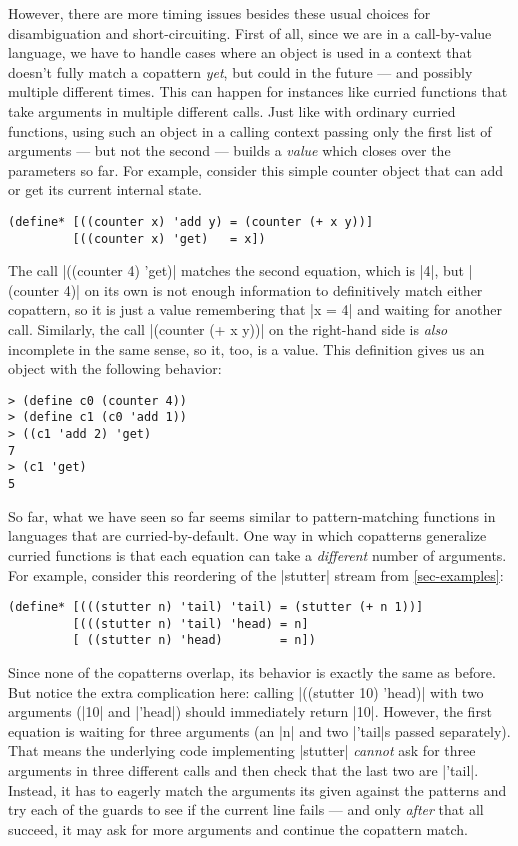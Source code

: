 However, there are more timing issues besides these usual choices for disambiguation and short-circuiting.
First of all, since we are in a call-by-value language, we have to handle cases where an object is used in a context that doesn't fully match a copattern \emph{yet}, but could in the future --- and possibly multiple different times.
This can happen for instances like curried functions that take arguments in multiple different calls.
Just like with ordinary curried functions, using such an object in a calling context passing only the first list of arguments --- but not the second --- builds a \emph{value} which closes over the parameters so far.
For example, consider this simple counter object that can add or get its current internal state.
\begin{verbatim}
(define* [((counter x) 'add y) = (counter (+ x y))]
         [((counter x) 'get)   = x])
\end{verbatim}
The call \scm|((counter 4) 'get)| matches the second equation, which is \scm|4|, but \scm|(counter 4)| on its own is not enough information to definitively match either copattern, so it is just a value remembering that \scm|x = 4| and waiting for another call.
Similarly, the call \scm|(counter (+ x y))| on the right-hand side is \emph{also} incomplete in the same sense, so it, too, is a value.
This definition gives us an object with the following behavior:
\begin{verbatim}
> (define c0 (counter 4))
> (define c1 (c0 'add 1))
> ((c1 'add 2) 'get)
7
> (c1 'get)
5
\end{verbatim}

So far, what we have seen so far seems similar to pattern-matching functions in languages that are curried-by-default.
One way in which copatterns generalize curried functions is that each equation can take a \emph{different} number of arguments.
For example, consider this reordering of the \scm|stutter| stream from \cref{sec-examples}:
\begin{verbatim}
(define* [(((stutter n) 'tail) 'tail) = (stutter (+ n 1))]
         [(((stutter n) 'tail) 'head) = n]
         [ ((stutter n) 'head)        = n])
\end{verbatim}
Since none of the copatterns overlap, its behavior is exactly the same as before.
But notice the extra complication here: calling \scm|((stutter 10) 'head)| with two arguments (\scm|10| and \scm|'head|) should immediately return \scm|10|.
However, the first equation is waiting for three arguments (an \scm|n| and two \scm|'tail|s passed separately).
That means the underlying code implementing \scm|stutter| \emph{cannot} ask for three arguments in three different calls and then check that the last two are \scm|'tail|.
Instead, it has to eagerly match the arguments its given against the patterns and try each of the guards to see if the current line fails --- and only \emph{after} that all succeed, it may ask for more arguments and continue the copattern match.

